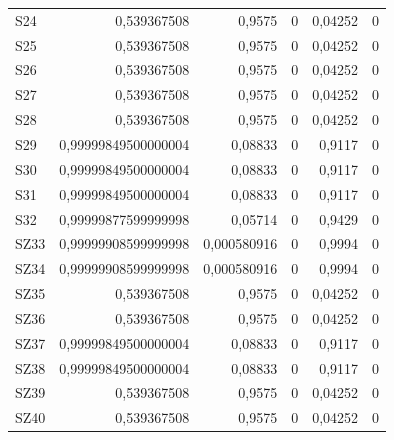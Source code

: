 \begin{longtable}{lrrrrr}
S24 & 0,539367508 & 0,9575 & 0 & 0,04252 & 0 \\
S25 & 0,539367508 & 0,9575 & 0 & 0,04252 & 0 \\
S26 & 0,539367508 & 0,9575 & 0 & 0,04252 & 0 \\
S27 & 0,539367508 & 0,9575 & 0 & 0,04252 & 0 \\
S28 & 0,539367508 & 0,9575 & 0 & 0,04252 & 0 \\
S29 & 0,99999849500000004 & 0,08833 & 0 & 0,9117 & 0 \\
S30 & 0,99999849500000004 & 0,08833 & 0 & 0,9117 & 0 \\
S31 & 0,99999849500000004 & 0,08833 & 0 & 0,9117 & 0 \\
S32 & 0,99999877599999998 & 0,05714 & 0 & 0,9429 & 0 \\
SZ33 & 0,99999908599999998 & 0,000580916 & 0 & 0,9994 & 0 \\
SZ34 & 0,99999908599999998 & 0,000580916 & 0 & 0,9994 & 0 \\
SZ35 & 0,539367508 & 0,9575 & 0 & 0,04252 & 0 \\
SZ36 & 0,539367508 & 0,9575 & 0 & 0,04252 & 0 \\
SZ37 & 0,99999849500000004 & 0,08833 & 0 & 0,9117 & 0 \\
SZ38 & 0,99999849500000004 & 0,08833 & 0 & 0,9117 & 0 \\
SZ39 & 0,539367508 & 0,9575 & 0 & 0,04252 & 0 \\
SZ40 & 0,539367508 & 0,9575 & 0 & 0,04252 & 0 \\
\hline
\end{longtable}